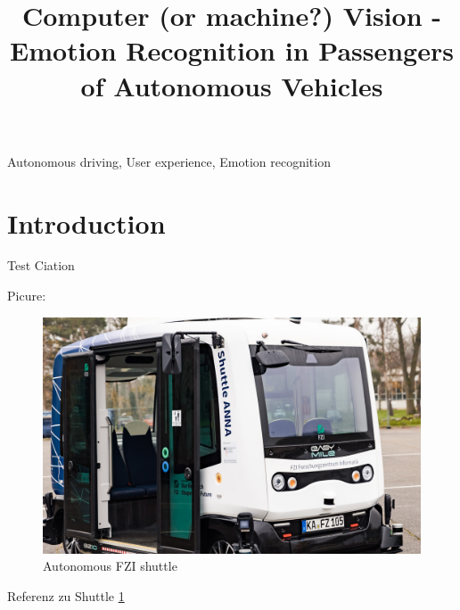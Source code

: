 \documentclass[conference]{IEEEtran}
\begin{document}
\title{Computer (or machine?) Vision - Emotion Recognition in
Passengers of Autonomous Vehicles}



\author{
    \and
    \and
}
\maketitle

\begin{abstract}
    \lipsum[2-4]
\end{abstract}

\begin{IEEEkeywords}
    Autonomous driving, User experience, Emotion recognition
\end{IEEEkeywords}

\section{Introduction}

Test Ciation \cite{test}

Picure:
\begin{figure}[ht]
    \centering
    \includegraphics[scale = 0.15]{pictures/Shuttle ganz.jpg}
    \caption{Autonomous FZI shuttle}
    \label{fig:Shuttle}
\end{figure}
Referenz zu Shuttle \ref{fig:Shuttle}
\newpage
\end{document}
